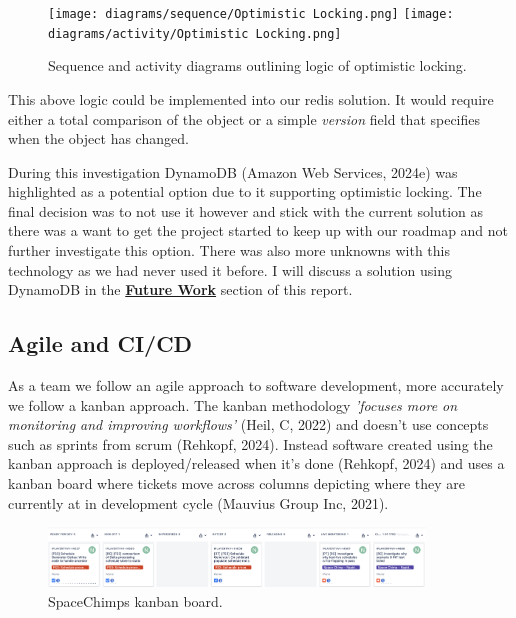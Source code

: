 \begin{itemize}
    \begin{figure}[H]
      \centering
      \texttt{[image: diagrams/sequence/Optimistic Locking.png]}
      \texttt{[image: diagrams/activity/Optimistic Locking.png]}
      \caption{Sequence and activity diagrams outlining logic of optimistic locking.}
      \label{fig:optimisticLocking}
    \end{figure}

    This above logic could be implemented into our redis solution. It would require either a total comparison of the object or a simple \textit{version}
    field that specifies when the object has changed.
  \end{itemize}

  During this investigation DynamoDB (Amazon Web Services, 2024e) was highlighted as a potential option due to it supporting optimistic
  locking. The final decision was to not use it however and stick with the current solution as there was a want to get the project started to keep 
  up with our roadmap and not further investigate this option. There was also more unknowns with this technology as we had never used it before.
  I will discuss a solution using DynamoDB in the \hyperref[sec:future]{\textbf{Future Work}} section of this report.
   
  \newpage
  \subsection{Agile and CI/CD}
  \label{sec:cicd}

  As a team we follow an agile approach to software development, more accurately we follow a kanban approach. The kanban methodology 
  \textit{'focuses more on monitoring and improving workflows'} (Heil, C, 2022) and doesn't use concepts such as sprints from scrum (Rehkopf, 2024). 
  Instead software created using the kanban approach is deployed/released when it's done (Rehkopf, 2024) and uses a kanban board where tickets move 
  across columns depicting where they are currently at in development cycle (Mauvius Group Inc, 2021).

  \begin{figure}[H]
    \centering
    \includegraphics[width=10cm]{assets/kanbanBoard.png}
    \caption{SpaceChimps kanban board.}
    \label{fig:kanbanBoard}
  \end{figure}

